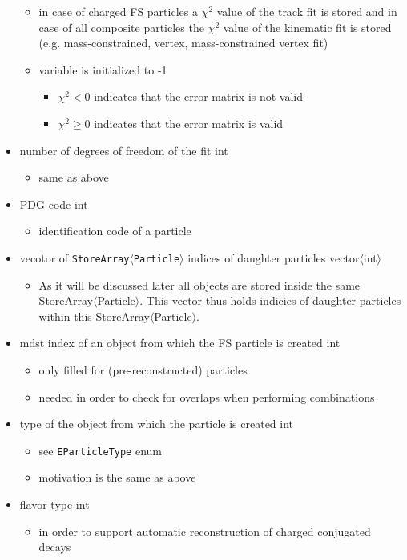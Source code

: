 \begin{itemize}
 \begin{itemize}
  \item in case of charged FS particles a $\chi^2$ value of the track fit is stored and in case of all composite particles the 
  $\chi^2$ value of the kinematic fit is stored (e.g. mass-constrained, vertex, mass-constrained vertex fit)
  \item variable is initialized to -1
  \begin{itemize}
   \item $\chi^2<0$ indicates that the error matrix is not valid
   \item $\chi^2\geq 0$ indicates that the error matrix is valid
  \end{itemize}
 \end{itemize}
 \item {\color{blue}number of degrees of freedom of the fit} \hfill{int}
 \begin{itemize}
  \item same as above
 \end{itemize}
 \item {\color{blue} PDG code} \hfill{int}
 \begin{itemize}
  \item identification code of a particle
 \end{itemize}
 \item {\color{blue} vecotor of {\tt StoreArray$\langle$Particle$\rangle$} indices of daughter particles} \hfill{vector$\langle$int$\rangle$}
 \begin{itemize}
  \item As it will be discussed later all \particle objects are stored inside the same StoreArray$\langle$Particle$\rangle$. This vector
  thus holds indicies of daughter particles within this StoreArray$\langle$Particle$\rangle$.
 \end{itemize}
 \item {\color{blue} mdst index of an object from which the FS particle is created} \hfill{int}
 \begin{itemize}
  \item only filled for (pre-reconstructed) particles
  \item needed in order to check for overlaps when performing combinations
 \end{itemize}
 \item {\color{blue} type of the object from which the particle is created } \hfill{int}
 \begin{itemize}
  \item see {\tt EParticleType} enum
  \item motivation is the same as above
 \end{itemize}
 \item {\color{blue}flavor type} \hfill{int}
 \begin{itemize}
  \item in order to support automatic reconstruction of charged conjugated decays
 \end{itemize}
\end{itemize}

